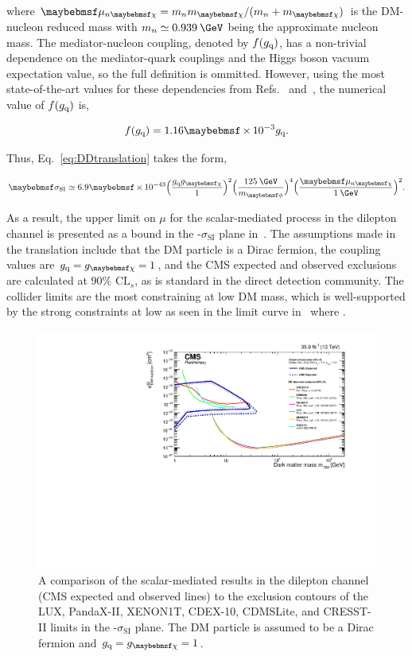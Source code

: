 where $\mu_{n\chi} = m_{n}\mDM/(m_{n}+\mDM)$ is the DM-nucleon reduced mass with $m_{n} \simeq 0.939\:\GeV$ being the approximate nucleon mass. The mediator-nucleon coupling, denoted by $f(g_{\text{q}})$, has a non-trivial dependence on the mediator-quark couplings and the Higgs boson vacuum expectation value, so the full definition is ommitted. However, using the most state-of-the-art values for these dependencies from Refs.~\cite{Hoferichter:2015dsa} and~\cite{Junnarkar:2013ac}, the numerical value of $f(g_{\text{q}})$ is,

\begin{equation}
  f(\gq) = 1.16 \times 10^{-3} \gq.
\end{equation} 

Thus, Eq.~\ref{eq:DDtranslation} takes the form,

\begin{equation}
  \sigma_{\textrm{SI}} \simeq 6.9 \times 10^{-43} \Big(\frac{\gq\gDM}{1}\Big)^{2}\Big(\frac{125\:\GeV}{\mMed}\Big)^{4}\Big(\frac{\mu_{n\chi}}{1\:\GeV}\Big)^{2}.
\end{equation}

As a result, the upper limit on $\mu$ for the scalar-mediated \ttDM process in the dilepton channel is presented as a bound in the \mDM-$\sigma_{\textrm{SI}}$ plane in~. The assumptions made in the translation include that the DM particle is a Dirac fermion, the coupling values are $\gq = \gDM = 1$, and the CMS expected and observed exclusions are calculated at $90\%$ $\textrm{CL}_{s}$, as is standard in the direct detection community. The collider limits are the most constraining at low DM mass, which is well-supported by the strong constraints at low \mMed as seen in the limit curve in~ where  \GeV.

\begin{figure}
  \centering
  \includegraphics[width=\textwidth]{figs/SIS_CMSDD_Summary.pdf}
  \caption{A comparison of the \ttDM scalar-mediated results in the dilepton channel (CMS expected and observed lines) to the exclusion contours of the LUX, PandaX-II, XENON1T, CDEX-10, CDMSLite, and CRESST-II limits in the \mDM-$\sigma_{\textrm{SI}}$ plane. The DM particle is assumed to be a Dirac fermion and $\gq = \gDM =1$.}
  \label{fig:DDplot}
\end{figure}

